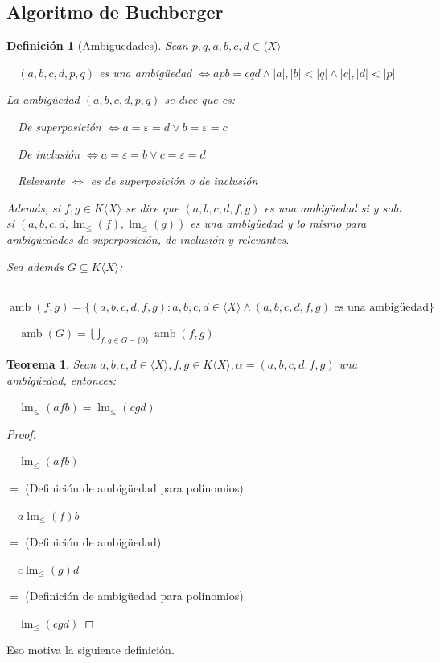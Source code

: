 \documentclass{amsbook}
\theoremstyle{customstyle}
\newtheorem{definition}{Definición}[section]
\newtheorem{theorem}{Teorema}[section]
\DeclareMathOperator{\lm}{lm}
\DeclareMathOperator{\amb}{amb}
\begin{document}
\subsection{Algoritmo de Buchberger}

\begin{definition}[Ambigüedades]
Sean $p, q, a, b, c, d ∈ ⟨X⟩$

  $(a, b, c, d, p, q)$ es una ambigüedad $ ⇔ apb = cqd ∧ |a|, |b| < |q| ∧ |c|, |d| < |p|$

La ambigüedad $(a, b, c, d, p, q)$ se dice que es:

  De superposición $⇔ a = ε = d ∨ b = ε = c$

  De inclusión $⇔ a = ε = b ∨ c = ε = d$

  Relevante $⇔$ es de superposición o de inclusión

Además, si $f, g ∈ K⟨X⟩$ se dice que $(a, b, c, d, f, g)$ es una ambigüedad si y solo si $(a, b, c, d, \lm_≤{(f)}, \lm_≤{(g)})$ es una ambigüedad y lo mismo para ambigüedades de superposición, de inclusión y relevantes.

Sea además $G ⊆ K⟨X⟩$:

  $\amb(f, g) = \{(a, b, c, d, f, g) : a, b, c, d ∈ ⟨X⟩ ∧ (a, b, c, d, f, g)\text{ es una ambigüedad}\}$

  $\amb(G) = \bigcup_{f, g ∈ G - \{0\}}{\amb(f, g)}$

\end{definition}

\begin{theorem}
Sean $a, b, c, d ∈ ⟨X⟩, f, g ∈ K⟨X⟩, α = (a, b, c, d, f, g)$ una ambigüedad, entonces:

  $\lm_≤{(afb)} = \lm_≤{(cgd)}$

\end{theorem}

\begin{proof}\

  $\lm_≤{(afb)}$

$=$ (Definición de ambigüedad para polinomios)

  $a\lm_≤{(f)}b$

$=$ (Definición de ambigüedad)

  $c\lm_≤{(g)}d$

$=$ (Definición de ambigüedad para polinomios)

  $\lm_≤{(cgd)}$

\end{proof}

Eso motiva la siguiente definición.
\end{document}
